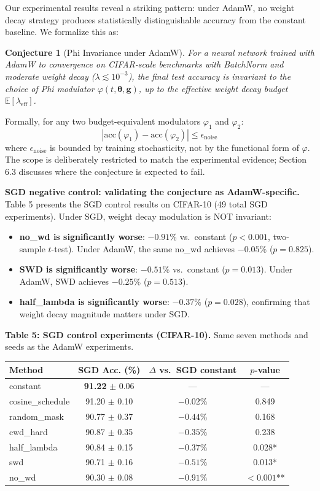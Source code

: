 \documentclass[
]{article}
\providecommand{\tightlist}{%
  \setlength{\itemsep}{0pt}\setlength{\parskip}{0pt}}
\begin{document}
Our experimental results reveal a striking pattern: under AdamW, no
weight decay strategy produces statistically distinguishable accuracy
from the constant baseline. We formalize this as:

\textbf{Conjecture 1} (Phi Invariance under AdamW). \emph{For a neural
network trained with AdamW to convergence on CIFAR-scale benchmarks with
BatchNorm and moderate weight decay (\(\lambda \lesssim 10^{-3}\)), the
final test accuracy is invariant to the choice of Phi modulator
\(\varphi(t, \boldsymbol{\theta}, \mathbf{g})\), up to the effective
weight decay budget \(\mathbb{E}[\lambda_{\mathrm{eff}}]\).}

Formally, for any two budget-equivalent modulators \(\varphi_1\) and
\(\varphi_2\): \[
|\mathrm{acc}(\varphi_1) - \mathrm{acc}(\varphi_2)| \leq \epsilon_{\mathrm{noise}}
\] where \(\epsilon_{\mathrm{noise}}\) is bounded by training
stochasticity, not by the functional form of \(\varphi\). The scope is
deliberately restricted to match the experimental evidence; Section 6.3
discusses where the conjecture is expected to fail.

\textbf{SGD negative control: validating the conjecture as
AdamW-specific.} Table 5 presents the SGD control results on CIFAR-10
(49 total SGD experiments). Under SGD, weight decay modulation is NOT
invariant:

\begin{itemize}
\tightlist
\item
  \textbf{no\_wd is significantly worse}: \(-0.91\%\) vs.~constant
  (\(p < 0.001\), two-sample \(t\)-test). Under AdamW, the same no\_wd
  achieves \(-0.05\%\) (\(p = 0.825\)).
\item
  \textbf{SWD is significantly worse}: \(-0.51\%\) vs.~constant
  (\(p = 0.013\)). Under AdamW, SWD achieves \(-0.25\%\)
  (\(p = 0.513\)).
\item
  \textbf{half\_lambda is significantly worse}: \(-0.37\%\)
  (\(p = 0.028\)), confirming that weight decay magnitude matters under
  SGD.
\end{itemize}

\textbf{Table 5: SGD control experiments (CIFAR-10).} Same seven methods
and seeds as the AdamW experiments.

\begin{longtable}[]{@{}lccc@{}}
\toprule\noalign{}
Method & SGD Acc. (\%) & \(\Delta\) vs.~SGD constant & \(p\)-value \\
\midrule\noalign{}
\endhead
\bottomrule\noalign{}
\endlastfoot
constant & \textbf{91.22} \(\pm\) 0.06 & --- & --- \\
cosine\_schedule & 91.20 \(\pm\) 0.10 & \(-0.02\%\) & 0.849 \\
random\_mask & 90.77 \(\pm\) 0.37 & \(-0.44\%\) & 0.168 \\
cwd\_hard & 90.87 \(\pm\) 0.35 & \(-0.35\%\) & 0.238 \\
half\_lambda & 90.84 \(\pm\) 0.15 & \(-0.37\%\) & 0.028* \\
swd & 90.71 \(\pm\) 0.16 & \(-0.51\%\) & 0.013* \\
no\_wd & 90.30 \(\pm\) 0.08 & \(-0.91\%\) & \(<0.001\)** \\
\end{longtable}
\end{document}
